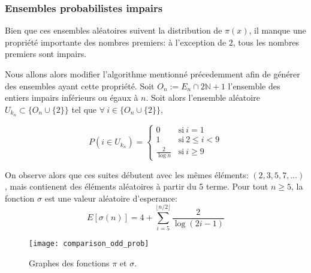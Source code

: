 \documentclass[../main.tex]{report}
\begin{document}
    \label{sec:odd_prob}
\subsubsection{Ensembles probabilistes impairs}
Bien que ces ensembles aléatoires suivent la distribution de $\pi(x)$, il manque une propriété importante des nombres premiers: à l'exception de $2$, tous les nombres premiers sont impairs.

Nous allons alors modifier l'algorithme mentionné précedemment afin de générer des ensembles ayant cette propriété. 
Soit $O_n := E_n \cap 2 \mathbb{N} +1$ l'ensemble des entiers impairs inférieurs ou égaux à $n$. 
Soit alors l'ensemble aléatoire 
$U_{k_n} \subset \{O_n \cup \{2\}\}$
tel que $\forall~i \in \{O_n \cup \{2\}\}$,

\[
P(i \in U_{k_n}) = 
\left\{ 
    \begin{array}{cl}
         0 & \mbox{si}~i = 1 \\
         1 & \mbox{si}~ 2 \leq i < 9 \\
         \frac{2}{\log n} & \mbox{si}~i \geq 9
    \end{array}
\right.
\]

On observe alors que ces suites débutent avec les mêmes éléments: $ (2,3,5,7,...) $, mais contienent des éléments aléatoires à partir du 5 terme. 
Pour tout $n \geq 5$, la fonction $\sigma$ est une valeur aléatoire d'esperance: 
\[
E[\sigma(n)] = 
4 + \sum_{i=5}^{\lfloor{n/2}\rfloor} \frac{2}{\log (2i-1)}
\]

\begin{figure}[H]
\texttt{[image: comparison\_odd\_prob]}

\caption{Graphes des fonctions $\pi$ et $\sigma$.}
\label{fig:comparison_sigma_prob}
\end{figure}
\end{document}
